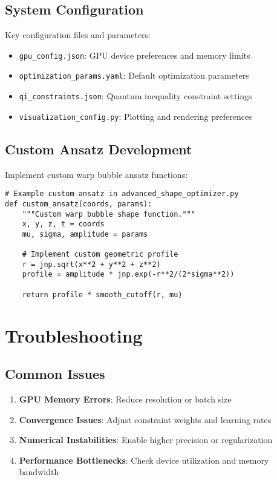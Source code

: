 \documentclass{article}
\begin{document}
\subsection{System Configuration}

Key configuration files and parameters:

\begin{itemize}
\item \texttt{gpu\_config.json}: GPU device preferences and memory limits
\item \texttt{optimization\_params.yaml}: Default optimization parameters
\item \texttt{qi\_constraints.json}: Quantum inequality constraint settings
\item \texttt{visualization\_config.py}: Plotting and rendering preferences
\end{itemize}

\subsection{Custom Ansatz Development}

Implement custom warp bubble ansatz functions:

\begin{lstlisting}
# Example custom ansatz in advanced_shape_optimizer.py
def custom_ansatz(coords, params):
    """Custom warp bubble shape function."""
    x, y, z, t = coords
    mu, sigma, amplitude = params
    
    # Implement custom geometric profile
    r = jnp.sqrt(x**2 + y**2 + z**2)
    profile = amplitude * jnp.exp(-r**2/(2*sigma**2))
    
    return profile * smooth_cutoff(r, mu)
\end{lstlisting}

\section{Troubleshooting}

\subsection{Common Issues}

\begin{enumerate}
\item \textbf{GPU Memory Errors}: Reduce resolution or batch size
\item \textbf{Convergence Issues}: Adjust constraint weights and learning rates
\item \textbf{Numerical Instabilities}: Enable higher precision or regularization
\item \textbf{Performance Bottlenecks}: Check device utilization and memory bandwidth
\end{enumerate}
\end{document}
